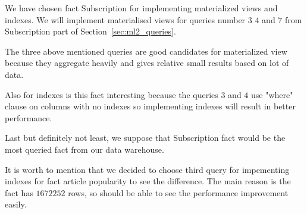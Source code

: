
We have chosen fact Subscription for implementing materialized views and indexes.
We will implement materialised views for queries number $3$ $4$ and $7$ from Subscription part of Section~\ref{sec:ml2_queries}.

The three above mentioned queries are good candidates for materialized view because they aggregate heavily and gives relative small results based on lot of data.
   
Also for indexes is this fact interesting because the queries $3$ and $4$ use "where" clause on columns with no indexes so implementing indexes will result in better performance.
 
Last but definitely not least, we suppose that Subscription fact would be the most queried fact from our data warehouse.

It is worth to mention that we decided to choose third query for impementing indexes for fact article popularity to see the difference. The main reason is the fact has $1 672 252$ rows, so should be able to see the performance improvement easily.
